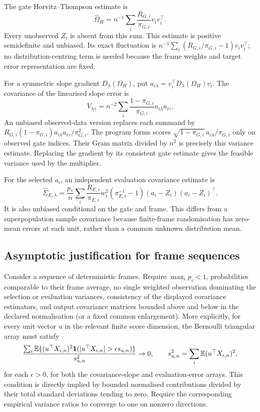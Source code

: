 The gate Horvitz--Thompson estimate is
\[
 \widehat\Omega_H=n^{-1}\sum_i\frac{R_{G,i}}{\pi_{G,i}}v_iv_i^\top.
\]
Every unobserved $Z_i$ is absent from this sum. This estimate is positive semidefinite and unbiased. Its exact fluctuation is $n^{-1}\sum_i(R_{G,i}/\pi_{G,i}-1)v_iv_i^\top$; no distribution-centring term is needed because the frame weights and target error representation are fixed.

For a symmetric slope gradient $D_\lambda(\Omega_H)$, put $a_{i\lambda}=v_i^\top D_\lambda(\Omega_H)v_i$. The covariance of the linearised slope error is
\[
 V_{\lambda\gamma}=n^{-2}\sum_i
 \frac{1-\pi_{G,i}}{\pi_{G,i}}a_{i\lambda}a_{i\gamma}.
\]
An unbiased observed-data version replaces each summand by
$R_{G,i}(1-\pi_{G,i})a_{i\lambda}a_{i\gamma}/\pi_{G,i}^2$.
The program forms scores
$\sqrt{1-\pi_{G,i}}\,a_{i\lambda}/\pi_{G,i}$ only on observed gate indices. Their Gram matrix divided by $n^2$ is precisely this variance estimate. Replacing the gradient by its consistent gate estimate gives the feasible variance used by the multiplier.

For the selected $a_i$, an independent evaluation covariance estimate is
\[
 \widehat\Sigma_{E,\lambda}=\frac{p_*}{n}\sum_i
 \frac{R_{E,i}}{\pi_{E,i}}w_i^2(\pi_{E,i}^{-1}-1)
 (a_i-Z_i)(a_i-Z_i)^\top.
\]
It is also unbiased conditional on the gate and frame. This differs from a superpopulation sample covariance because finite-frame randomisation has zero-mean errors at each unit, rather than a common unknown distribution mean.

\subsection{Asymptotic justification for frame sequences}
Consider a sequence of deterministic frames. Require $\max_i p_i<1$, probabilities comparable to their frame average, no single weighted observation dominating the selection or evaluation variances, consistency of the displayed covariance estimators, and output covariance matrices bounded above and below in the declared normalisation (or a fixed common enlargement). More explicitly, for every unit vector $u$ in the relevant finite score dimension, the Bernoulli triangular array must satisfy
\[
 \frac{\sum_i\E\{(u^\top X_{i,n})^2
 \ind(|u^\top X_{i,n}|>\epsilon s_{u,n})\}}{s_{u,n}^2}\to0,
 \qquad s_{u,n}^2=\sum_i\E(u^\top X_{i,n})^2,
\]
for each $\epsilon>0$, for both the covariance-slope and evaluation-error arrays. This condition is directly implied by bounded normalised contributions divided by their total standard deviations tending to zero. Require the corresponding empirical variance ratios to converge to one on nonzero directions.

